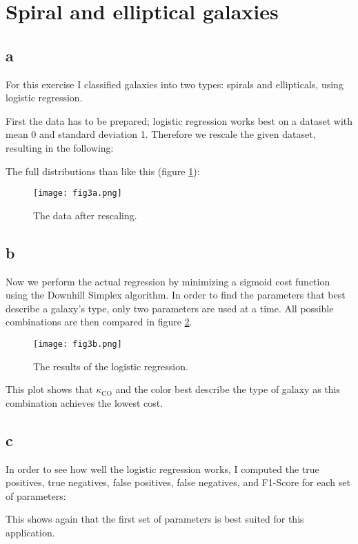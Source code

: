 \section{Spiral and elliptical galaxies}


\subsection*{a}
For this exercise I classified galaxies into two types: spirals and ellipticals, using logistic regression.

First the data has to be prepared; logistic regression works best on a dataset with mean 0 and standard deviation 1.
Therefore we rescale the given dataset, resulting in the following:


The full distributions than like this (figure \ref{fig:rescaled_data}):
\begin{figure}
    \centering
    \texttt{[image: fig3a.png]}
    \caption{The data after rescaling.}
    \label{fig:rescaled_data}
\end{figure}





\subsection*{b}
Now we perform the actual regression by minimizing a sigmoid cost function using the Downhill Simplex algorithm.
In order to find the parameters that best describe a galaxy's type, only two parameters are used at a time.
All possible combinations are then compared in figure \ref{fig:logistic_regression}.

\begin{figure}
    \centering
    \texttt{[image: fig3b.png]}
    \caption{The results of the logistic regression.}
    \label{fig:logistic_regression}
\end{figure}

This plot shows that $\kappa_{\text{CO}}$ and the color best describe the type of galaxy as this combination achieves the lowest cost.




\subsection*{c}
In order to see how well the logistic regression works, I computed the true positives, true negatives, false positives, false negatives, and F1-Score for each set of parameters:


This shows again that the first set of parameters is best suited for this application.



